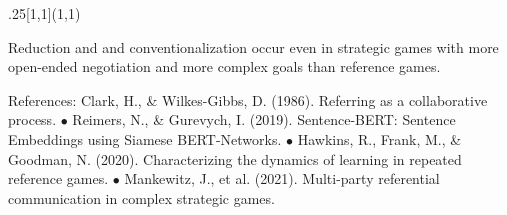 \documentclass[10pt, xcolor=table, dvipsnames]{beamer}
\begin{document}
	\begin{textblock}{.25}[1,1](1,1)
		\begin{tcolorbox}[title= {\centering Conclusion}]
			\vspace{.5em}
			
			\begin{small}
				
				 Reduction and 
				and conventionalization occur even in strategic games with more open-ended negotiation and more complex goals than reference games. 
			
			\end{small}
		
		\vspace{.5em}
		\begin{tiny}
			References: Clark, H., \& Wilkes-Gibbs, D. (1986). Referring as a collaborative
			process. $\bullet$
			Reimers, N., \& Gurevych, I. (2019). Sentence-{BERT}:
				{Sentence Embeddings} using {Siamese BERT-Networks}. $\bullet$ 
Hawkins, R., Frank, M., \& Goodman, N. (2020). Characterizing
			the dynamics of learning in repeated reference games. $\bullet$
		Mankewitz, J., et al. (2021). Multi-party referential communication in
	complex strategic games. 
	
	
			\end{tiny}
		
\end{tcolorbox}
\end{textblock}
	
\end{document}
